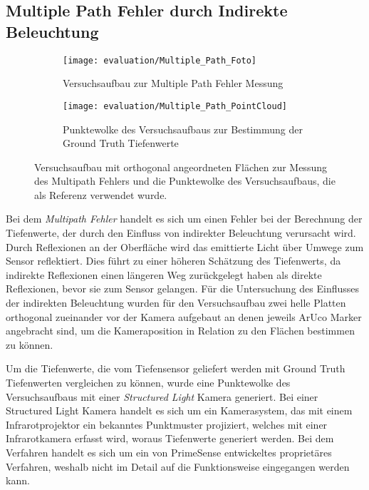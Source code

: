 \documentclass[thesis.tex]{subfiles}
\begin{document}
\subsection{Multiple Path Fehler durch Indirekte Beleuchtung}\label{sec:multipath_problem}
%
\begin{figure}[h!]
\centering
\begin{subfigure}[b]{0.49\textwidth}\texttt{[image: evaluation/Multiple\_Path\_Foto]}
    \caption{Versuchsaufbau zur Multiple Path Fehler Messung}
\end{subfigure}
\begin{subfigure}[b]{0.49\textwidth}\texttt{[image: evaluation/Multiple\_Path\_PointCloud]}
    \caption{Punktewolke des Versuchsaufbaus zur Bestimmung der Ground Truth Tiefenwerte}
\end{subfigure}
\caption{Versuchsaufbau mit orthogonal angeordneten Flächen zur Messung des Multipath Fehlers und die Punktewolke des Versuchsaufbaus, die als Referenz verwendet wurde.}
\label{fig:multiple_path_error_experiment}
\end{figure}

Bei dem \emph{Multipath Fehler} handelt es sich um einen Fehler bei der Berechnung der Tiefenwerte, der durch den Einfluss von indirekter Beleuchtung verursacht wird. Durch Reflexionen an der Oberfläche wird das emittierte Licht über Umwege zum Sensor reflektiert. Dies führt zu einer höheren Schätzung des Tiefenwerts, da indirekte Reflexionen einen längeren Weg zurückgelegt haben als direkte Reflexionen, bevor sie zum Sensor gelangen. Für die Untersuchung des Einflusses der indirekten Beleuchtung wurden für den Versuchsaufbau zwei helle Platten orthogonal zueinander vor der Kamera aufgebaut an denen jeweils ArUco Marker angebracht sind, um die Kameraposition in Relation zu den Flächen bestimmen zu können. 

Um die Tiefenwerte, die vom Tiefensensor geliefert werden mit Ground Truth Tiefenwerten vergleichen zu können, wurde eine Punktewolke des Versuchsaufbaus mit einer \emph{Structured Light} Kamera generiert. Bei einer Structured Light Kamera handelt es sich um ein Kamerasystem, das mit einem Infrarotprojektor ein bekanntes Punktmuster projiziert, welches mit einer Infrarotkamera erfasst wird, woraus Tiefenwerte generiert werden. Bei dem Verfahren handelt es sich um ein von PrimeSense entwickeltes proprietäres Verfahren, weshalb nicht im Detail auf die Funktionsweise eingegangen werden kann.
\end{document}
